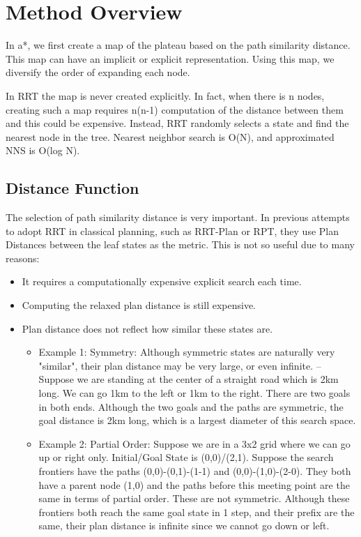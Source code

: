 \section{Method Overview}
\label{sec-2}


In \*a*, we first create a map of the plateau based on the path similarity
distance. This map can have an implicit or explicit representation.
Using this map, we diversify the order of expanding each node.

In RRT the map is never created explicitly.
In fact, when there is n nodes, creating such a map requires n(n-1) computation of the distance
between them and this could be expensive. Instead, RRT randomly selects a state
and find the nearest node in the tree. Nearest neighbor search is O(N), and
approximated NNS is O(log N).

\subsection{Distance Function}
\label{sec-2-1}

The selection of path similarity distance is very important.
In previous attempts to adopt RRT in classical planning, such as
RRT-Plan or RPT, they use Plan Distances between the leaf states as the
metric. This is not so useful due to many reasons:

\begin{itemize}
\item It requires a computationally expensive explicit search each time.
\item Computing the relaxed plan distance is still expensive.
\item Plan distance does not reflect how similar these states are.
\begin{itemize}
\item Example 1: Symmetry: Although symmetric states are naturally very
"similar", their plan distance may be very large, or even
infinite. -- Suppose we are standing at the center of a straight
road which is 2km long. We can go 1km to the left or 1km to the
right. There are two goals in both ends. Although the two goals and the
paths are symmetric, the goal distance is 2km long, which is a largest
diameter of this search space.
\item Example 2: Partial Order: Suppose we are in a 3x2 grid where we can go
up or right only. Initial/Goal State is (0,0)/(2,1). Suppose the search
frontiers have the paths (0,0)-(0,1)-(1-1) and (0,0)-(1,0)-(2-0).
They both have a parent node
(1,0) and the paths before this meeting point are the same in terms of
partial order. These are not symmetric. Although these frontiers both reach
the same goal state in 1 step, and their prefix are the same, their
plan distance is infinite since we cannot go down or left.
\end{itemize}
\end{itemize}

